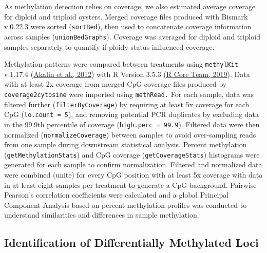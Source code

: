\documentclass [11pt, proquest] {uwthesis}[2015/03/03]
\begin{document}
As methylation detection relies on coverage, we also estimated average coverage for diploid and triploid oysters. Merged coverage files produced with Bismark v.0.22.3 were sorted (\texttt{sortBed}), then used to concatenate coverage information across samples (\texttt{unionBedGraphs}). Coverage was averaged for diploid and triploid samples separately to quantify if ploidy status influenced coverage.

Methylation patterns were compared between treatments using \texttt{methylKit} v.1.17.4 (\protect\hyperlink{ref-Akalin2012}{Akalin et al., 2012}) with R Version 3.5.3 (\protect\hyperlink{ref-R_Core_Team2019}{R Core Team, 2019}). Data with at least 2x coverage from merged CpG coverage files produced by \texttt{coverage2cytosine} were imported using \texttt{methRead.} For each sample, data was filtered further (\texttt{filterByCoverage}) by requiring at least 5x coverage for each CpG (\texttt{lo.count\ =\ 5}), and removing potential PCR duplicates by excluding data in the 99.9th percentile of coverage (\texttt{high.perc\ =\ 99.9}). Filtered data were then normalized (\texttt{normalizeCoverage}) between samples to avoid over-sampling reads from one sample during downstream statistical analysis. Percent methylation (\texttt{getMethylationStats}) and CpG coverage (\texttt{getCoverageStats}) histograms were generated for each sample to confirm normalization. Filtered and normalized data were combined (unite) for every CpG position with at least 5x coverage with data in at least eight samples per treatment to generate a CpG background. Pairwise Pearson's correlation coefficients were calculated and a global Principal Component Analysis based on percent methylation profiles was conducted to understand similarities and differences in sample methylation.

\hypertarget{identification-of-differentially-methylated-loci-1}{%
\subsection{Identification of Differentially Methylated Loci}\label{identification-of-differentially-methylated-loci-1}}
\end{document}
